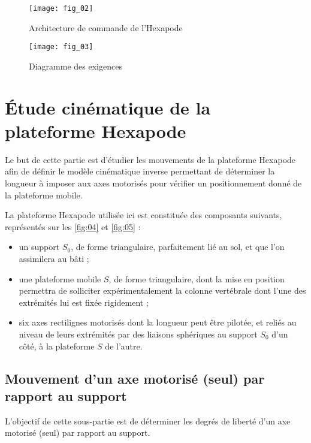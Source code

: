 \begin{figure}[H]
\centering
\texttt{[image: fig\_02]}
\caption{\label{fig:02} Architecture de commande de l’Hexapode }
\end{figure}


\begin{figure}[H]
\centering
\texttt{[image: fig\_03]}
\caption{\label{fig:03} Diagramme des exigences }
\end{figure}



\section{\label{sec:01} Étude cinématique de la plateforme Hexapode}

\begin{obj}
Le but de cette partie est d’étudier les mouvements de la plateforme Hexapode afin de définir le modèle
cinématique inverse permettant de déterminer la longueur à imposer aux axes motorisés pour vérifier
un positionnement donné de la plateforme mobile.
\end{obj}
La plateforme Hexapode utilisée ici est constituée des composants suivants, représentés sur les \autoref{fig:04} et \autoref{fig:05} :
\begin{itemize}
\item un support $S_0$, de forme triangulaire, parfaitement lié au sol, et que l’on assimilera au bâti ;
\item une plateforme mobile $S$, de forme triangulaire, dont la mise en position permettra de solliciter expérimentalement
la colonne vertébrale dont l’une des extrémités lui est fixée rigidement ;
\item six axes rectilignes motorisés dont la longueur peut être pilotée, et reliés au niveau de leurs extrémités par
des liaisons sphériques au support $S_0$ d’un côté, à la plateforme $S$ de l’autre.
\end{itemize}

\subsection{ Mouvement d’un axe motorisé (seul) par rapport au support}



\begin{obj}
L’objectif de cette sous-partie est de déterminer les degrés de liberté d’un axe motorisé (seul) par
rapport au support.
\end{obj}

